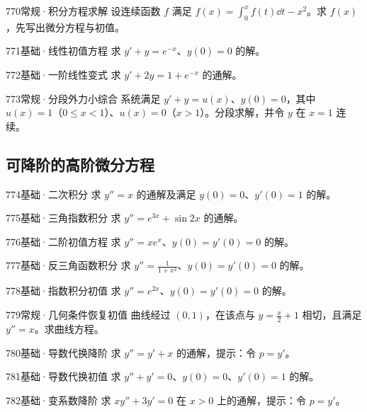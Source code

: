 \begin{exercise}{770}{常规·积分方程求解}
设连续函数 $f$ 满足 $f(x)=\int_0^xf(t)\dd t-x^2$。求 $f(x)$，先写出微分方程与初值。
\end{exercise}
\begin{exercise}{771}{基础·线性初值方程}
求 $y'+y=e^{-x}$、$y(0)=0$ 的解。
\end{exercise}
\begin{exercise}{772}{基础·一阶线性变式}
求 $y'+2y=1+e^{-x}$ 的通解。
\end{exercise}
\begin{exercise}{773}{常规·分段外力小综合}
系统满足 $y'+y=u(x)$、$y(0)=0$，其中 $u(x)=1$（$0\le x<1$）、$u(x)=0$（$x>1$）。分段求解，并令 $y$ 在 $x=1$ 连续。
\end{exercise}
\subsection{可降阶的高阶微分方程}
\begin{exercise}{774}{基础·二次积分}
求 $y''=x$ 的通解及满足 $y(0)=0$、$y'(0)=1$ 的解。
\end{exercise}
\begin{exercise}{775}{基础·三角指数积分}
求 $y''=e^{3x}+\sin2x$ 的通解。
\end{exercise}
\begin{exercise}{776}{基础·二阶初值方程}
求 $y''=xe^x$、$y(0)=y'(0)=0$ 的解。
\end{exercise}
\begin{exercise}{777}{基础·反三角函数积分}
求 $y''=\frac{1}{1+x^2}$、$y(0)=y'(0)=0$ 的解。
\end{exercise}
\begin{exercise}{778}{基础·指数积分初值}
求 $y''=e^{2x}$、$y(0)=y'(0)=0$ 的解。
\end{exercise}
\begin{exercise}{779}{常规·几何条件恢复初值}
曲线经过 $(0,1)$，在该点与 $y=\frac{x}{2}+1$ 相切，且满足 $y''=x$。求曲线方程。
\end{exercise}
\begin{exercise}{780}{基础·导数代换降阶}
求 $y''=y'+x$ 的通解，提示：令 $p=y'$。
\end{exercise}
\begin{exercise}{781}{基础·导数代换初值}
求 $y''+y'=0$、$y(0)=0$、$y'(0)=1$ 的解。
\end{exercise}
\begin{exercise}{782}{基础·变系数降阶}
求 $xy''+3y'=0$ 在 $x>0$ 上的通解，提示：令 $p=y'$。
\end{exercise}
